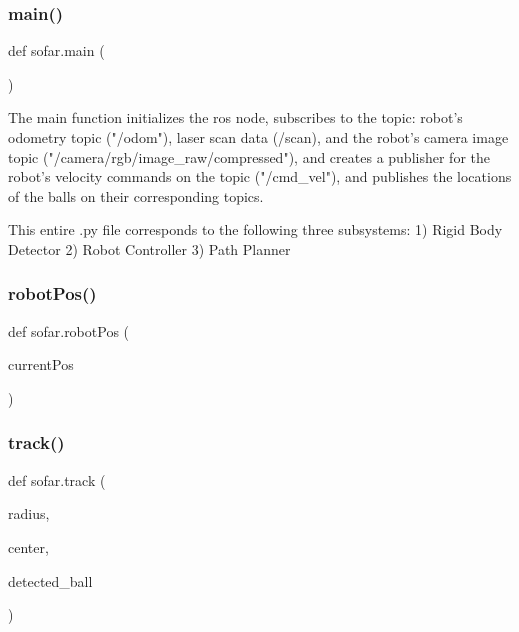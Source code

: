 \mbox{\label{namespacesofar_ab35e3b9e08ad442b61908f372cfa2cdf}} 
\subsubsection{\texorpdfstring{main()}{main()}}
{\footnotesize\ttfamily def sofar.\+main (\begin{DoxyParamCaption}{ }\end{DoxyParamCaption})}

\begin{DoxyVerb}The main function initializes the ros node, subscribes to the topic: robot's odometry topic ("/odom"), laser scan data (/scan), and the robot's camera image topic ("/camera/rgb/image_raw/compressed"), and creates a publisher for the robot's velocity commands on the topic ("/cmd_vel"), and publishes the locations of the balls on their corresponding topics.

This entire .py file corresponds to the following three subsystems:
1) Rigid Body Detector
2) Robot Controller
3) Path Planner 
\end{DoxyVerb}
 \mbox{\label{namespacesofar_aa6fd2d163a1a1c29d8298f0df2004607}} 
\subsubsection{\texorpdfstring{robot\+Pos()}{robotPos()}}
{\footnotesize\ttfamily def sofar.\+robot\+Pos (\begin{DoxyParamCaption}\item[{}]{current\+Pos }\end{DoxyParamCaption})}

\mbox{\label{namespacesofar_afc2980d2494d4c3237555ed677620318}} 
\subsubsection{\texorpdfstring{track()}{track()}}
{\footnotesize\ttfamily def sofar.\+track (\begin{DoxyParamCaption}\item[{}]{radius,  }\item[{}]{center,  }\item[{}]{detected\+\_\+ball }\end{DoxyParamCaption})}

